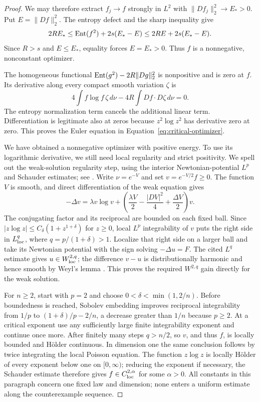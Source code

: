 \begin{proof}
We may therefore extract $f_j\to f$ strongly in $L^2$ with
$\|Df_j\|_2^2\to E_*>0$. Put $E=\|Df\|_2^2$. The entropy
defect and the sharp inequality give
\[
 2RE_*\le\operatorname{Ent}(f^2)+2s(E_*-E)
         \le2RE+2s(E_*-E).
\]
Since $R>s$ and $E\le E_*$, equality forces $E=E_*>0$.
Thus $f$ is a nonnegative, nonconstant optimizer.

The homogeneous functional
$\operatorname{Ent}(g^2)-2R\|Dg\|_2^2$ is nonpositive and is zero at $f$.
Its derivative along every compact smooth variation $\zeta$ is
\[
 4\int f\log f\,\zeta\,d\nu
       -4R\int Df\cdot D\zeta\,d\nu=0.
\]
The entropy normalization term cancels the additional linear term.
Differentiation is legitimate also at zeros because
$z^2\log z^2$ has derivative zero at zero. This proves the Euler
equation in Equation~\eqref{eq:critical-optimizer}.

We have obtained a nonnegative optimizer with positive energy.  To use
its logarithmic derivative, we still need local regularity and strict
positivity.  We spell out the weak-solution regularity step, using the
interior Newtonian-potential $L^p$ and Schauder estimates; see
\cite[Lecture~24, p.~2; Lecture~10, Proposition~1]{Viaclovsky2004}.
Write $\nu=e^{-V}$ and set $v=e^{-V/2}f\ge0$.  The function $V$ is smooth,
and direct differentiation of the weak equation gives
\[
 -\Delta v=\lambda v\log v+
 \left(\frac{\lambda V}{2}-\frac{|DV|^2}{4}
                         +\frac{\Delta V}{2}\right)v.
\]
The conjugating factor and its reciprocal are bounded on each fixed
ball.  Since $|z\log z|\le C_\delta(1+z^{1+\delta})$ for $z\ge0$,
local $L^p$ integrability of $v$ puts the right side in
$L^q_{\rm loc}$, where $q=p/(1+\delta)>1$.  Localize that right side
on a larger ball and take its Newtonian potential with the sign solving
$-\Delta u=F$.  The cited $L^q$ estimate gives $u\in W^{2,q}_{\rm loc}$;
the difference $v-u$ is distributionally harmonic and hence smooth by
Weyl's lemma \cite[Lecture~3, Theorem~2]{Viaclovsky2004}.
This proves the required $W^{2,q}$ gain directly for the weak solution.

For $n\ge2$, start with $p=2$ and choose
$0<\delta<\min(1,2/n)$.  Before boundedness is reached, Sobolev
embedding improves reciprocal integrability from $1/p$ to
$(1+\delta)/p-2/n$, a decrease greater than $1/n$ because $p\ge2$.
At a critical exponent use any sufficiently large finite integrability
exponent and continue once more.  After finitely many steps $q>n/2$,
so $v$, and thus $f$, is locally bounded and H\"older continuous.
In dimension one the same conclusion follows by twice integrating the
local Poisson equation.  The function $z\log z$ is locally H\"older
of every exponent below one on $[0,\infty)$; reducing the exponent
if necessary, the Schauder estimate therefore gives
$f\in C^{2,\alpha}_{\rm loc}$ for some $\alpha>0$.
All constants in this paragraph concern one fixed law and dimension;
none enters a uniform estimate along the counterexample sequence.


\end{proof}
